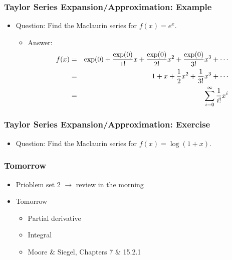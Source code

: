 \documentclass[pdflatex, 12pt]{beamer}
\begin{document}
\begin{frame}
\frametitle{Taylor Series Expansion/Approximation: Example}
\begin{itemize}
\item Question: Find the Maclaurin series for $f(x) = e^x$.
\vspace{0.4cm}
 \begin{itemize}
 \item Answer:
  {\footnotesize
  \begin{eqnarray}
  f(x) &=& \exp(0) + \frac{\exp(0)}{1!}x + \frac{\exp(0)}{2!}x^2 + \frac{\exp(0)}{3!}x^3 + \cdots \notag \\
  &=& 1 + x + \frac{1}{2}x^2 + \frac{1}{3!}x^3 + \cdots \notag \\
  &=& \sum_{i = 0}^{\infty} \frac{1}{i!}x^i \notag
  \end{eqnarray}
  }
 \end{itemize}
\end{itemize}
\end{frame}

\begin{frame}
\frametitle{Taylor Series Expansion/Approximation: Exercise}
\begin{itemize}
\item Question: Find the Maclaurin series for $f(x) = \log(1 + x)$.
\end{itemize}
\end{frame}

\begin{frame}
\frametitle{Tomorrow}
\begin{itemize}
\item Prioblem set 2 $\rightarrow$ review in the morning
\vspace{0.4cm}
\item Tomorrow
 \begin{itemize}
 \item Partial derivative
 \item Integral
 \item Moore \& Siegel, Chapters 7 \& 15.2.1
 \end{itemize}
\end{itemize}
\end{frame}
\end{document}
